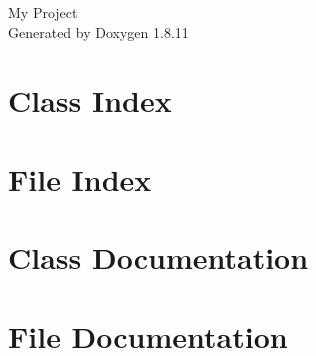 \documentclass[twoside]{book}
\newcommand{\+}{\discretionary{\mbox{\scriptsize$\hookleftarrow$}}{}{}}
\newcommand{\clearemptydoublepage}{%
  \newpage{\pagestyle{empty}\cleardoublepage}%
}
\begin{document}
\hypersetup{pageanchor=false,
             bookmarksnumbered=true,
             pdfencoding=unicode
            }
\begin{titlepage}
\vspace*{7cm}
\begin{center}%
{\Large My Project }\\
\vspace*{1cm}
{\large Generated by Doxygen 1.8.11}\\
\end{center}
\end{titlepage}
\clearemptydoublepage
\tableofcontents
\clearemptydoublepage
{}
\hypersetup{pageanchor=true}

\chapter{Class Index}

\chapter{File Index}

\chapter{Class Documentation}









\chapter{File Documentation}




\backmatter
\newpage
{}
\clearemptydoublepage
{}
\printindex
\end{document}
